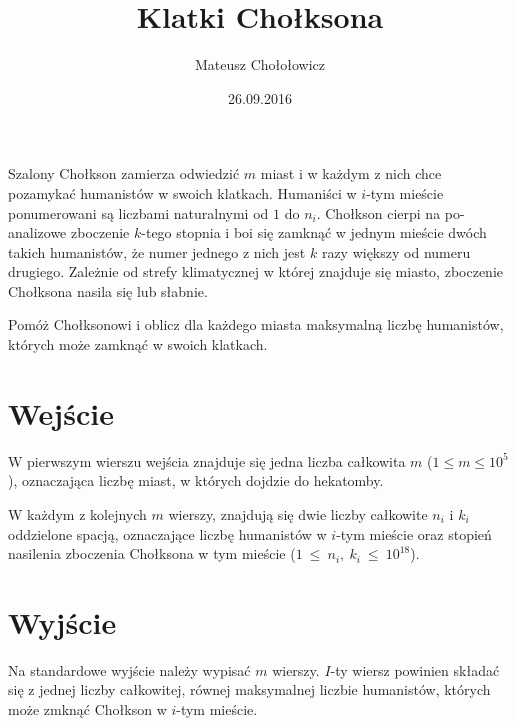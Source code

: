 \documentclass[zad,zawodnik,utf8]{sinol}
\title{Klatki Chołksona}
\author{Mateusz Chołołowicz} %
\date{26.09.2016}
\begin{document}
  \begin{tasktext}%

Szalony Chołkson zamierza odwiedzić $m$ miast i w każdym z nich chce pozamykać humanistów w swoich klatkach. Humaniści w $i$-tym mieście ponumerowani
są liczbami naturalnymi od $1$ do $n_i$. 
Chołkson cierpi na po-analizowe zboczenie $k$-tego stopnia i boi się zamknąć w jednym mieście dwóch takich humanistów, że numer jednego z nich jest $k$ razy większy od numeru drugiego. 
Zależnie od strefy klimatycznej w której znajduje się miasto, zboczenie Chołksona nasila się lub słabnie.

Pomóż Chołksonowi i oblicz dla każdego miasta maksymalną liczbę humanistów, których może zamknąć w swoich klatkach.

 \section{Wejście}
    
W pierwszym wierszu wejścia znajduje się jedna liczba całkowita $m$ ($1 \leq m \leq 10^5$), oznaczająca liczbę miast, w których dojdzie do hekatomby.

W każdym z kolejnych $m$ wierszy, znajdują się dwie liczby całkowite $n_i$ i $k_i$ oddzielone spacją, oznaczające liczbę humanistów w $i$-tym mieście oraz stopień nasilenia
zboczenia Chołksona w tym mieście ($1~\leq~n_i,~k_i~\leq~10^{18}$).

  \section{Wyjście}
Na standardowe wyjście należy wypisać $m$ wierszy. $I$-ty wiersz powinien składać się z jednej liczby całkowitej, równej maksymalnej liczbie humanistów, których
może zmknąć Chołkson w $i$-tym mieście.
    
\makecompactexample

  \end{tasktext}
\end{document}
